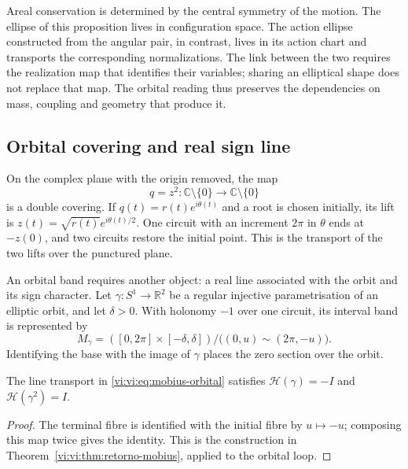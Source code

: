Areal conservation is determined by the central symmetry
of the motion. The ellipse of this proposition lives in
configuration space. The action ellipse constructed
from the angular pair, in contrast, lives in its action chart
and transports the corresponding normalizations. The link
between the two requires the realization map that identifies their
variables; sharing an elliptical shape does not replace that map.
The orbital reading thus preserves the dependencies on mass,
coupling and geometry that produce it.

\subsection{Orbital covering and real sign line}
\label{vi:vi:subsec:cubierta-orbital}

On the complex plane with the origin removed, the map
\begin{equation}
 q=z^2:\mathbb C\setminus\{0\}\longrightarrow
                 \mathbb C\setminus\{0\}
 \label{vi:vi:eq:levi-civita}
\end{equation}
is a double covering. If $q(t)=r(t)e^{i\theta(t)}$ and a
root is chosen initially, its lift is
$z(t)=\sqrt{r(t)}e^{i\theta(t)/2}$. One circuit with an increment
$2\pi$ in $\theta$ ends at $-z(0)$, and two circuits
restore the initial point. This is the transport of the two
lifts over the punctured plane.

An orbital band requires another object: a real line
associated with the orbit and its sign character. Let
$\gamma:S^1\to\mathbb R^2$ be a regular injective
parametrisation of an elliptic orbit, and let $\delta>0$. With
holonomy $-1$ over one circuit, its interval band is
represented by
\begin{equation}
 M_\gamma=([0,2\pi]\times[-\delta,\delta])/
          \bigl((0,u)\sim(2\pi,-u)\bigr).
 \label{vi:vi:eq:mobius-orbital}
\end{equation}
Identifying the base with the image of $\gamma$
places the zero section over the orbit.

\begin{proposition}
\label{vi:vi:prop:holonomia-orbital}
The line transport in \eqref{vi:vi:eq:mobius-orbital}
satisfies
$\mathcal H(\gamma)=-I$ and $\mathcal H(\gamma^2)=I$.
\end{proposition}
\begin{proof}
The terminal fibre is identified with the initial fibre by
$u\mapsto-u$; composing this map twice gives the identity.
This is the construction in
Theorem~\ref{vi:vi:thm:retorno-mobius}, applied to the orbital loop.
\end{proof}

